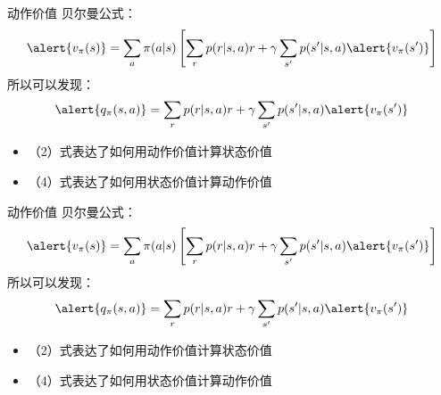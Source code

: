 \documentclass[aspectratio=169,xcolor=dvipsnames]{beamer}
\begin{document}
\begin{frame}{动作价值}
    贝尔曼公式：
    \begin{equation}
        \alert{v_\pi(s)}=\sum_a\pi(a|s)\left[\sum_r p(r|s,a)r+\gamma\sum_{s'}p(s'|s,a)\alert{v_{\pi}(s')}\right]
    \end{equation}
    所以可以发现：
    \begin{equation}
        \alert{q_\pi(s,a)}=\sum_r p(r|s,a)r+\gamma\sum_{s'}p(s'|s,a)\alert{v_{\pi}(s')}
    \end{equation}
    \begin{itemize}
        \item （2）式表达了如何用动作价值计算状态价值
        \item （4）式表达了如何用状态价值计算动作价值
    \end{itemize}
\end{frame}

\begin{frame}{动作价值}
    贝尔曼公式：
    \begin{equation}
        \alert{v_\pi(s)}=\sum_a\pi(a|s)\left[\sum_r p(r|s,a)r+\gamma\sum_{s'}p(s'|s,a)\alert{v_{\pi}(s')}\right]
    \end{equation}
    所以可以发现：
    \begin{equation}
        \alert{q_\pi(s,a)}=\sum_r p(r|s,a)r+\gamma\sum_{s'}p(s'|s,a)\alert{v_{\pi}(s')}
    \end{equation}
    \begin{itemize}
        \item （2）式表达了如何用动作价值计算状态价值
        \item （4）式表达了如何用状态价值计算动作价值
    \end{itemize}
\end{frame}
\end{document}
